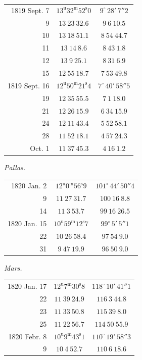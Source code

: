 \begin{center}
\begin{tabular}{r|c|c}
1819 Sept. 7 & $13^{\mathrm u}32^{\mathrm m}52^{\mathrm s}0$ & $9^\circ\,28'\,7''2$ \\
9 & $13\ 23\ 32.6$ & $9\ 6\ 10.5$ \\
10 & $13\ 18\ 51.1$ & $8\ 54\ 44.7$ \\
11 & $13\ 14\ 8.6$ & $8\ 43\ 1.8$ \\
12 & $13\ 9\ 25.1$ & $8\ 31\ 6.9$ \\
15 & $12\ 55\ 18.7$ & $7\ 53\ 49.8$ \\
\hline
1819 Sept. 16 & $12^{\mathrm u}50^{\mathrm m}21^{\mathrm s}4$ & $7^\circ\,40'\,58''5$ \\
19 & $12\ 35\ 55.5$ & $7\ 1\ 18.0$ \\
21 & $12\ 26\ 15.9$ & $6\ 34\ 15.9$ \\
24 & $12\ 11\ 43.4$ & $5\ 52\ 58.1$ \\
28 & $11\ 52\ 18.1$ & $4\ 57\ 24.3$ \\
Oct. 1 & $11\ 37\ 45.3$ & $4\ 16\ 1.2$ \\
\end{tabular}
\end{center}

\begin{center}
\textit{Pallas.}
\end{center}

\begin{center}
\begin{tabular}{r|c|c}
1820 Jan. 2 & $12^{\mathrm u}0^{\mathrm m}56^{\mathrm s}9$ & $101^\circ\,44'\,50''4$ \\
9 & $11\ 27\ 31.7$ & $100\ 16\ 8.8$ \\
14 & $11\ 3\ 53.7$ & $99\ 16\ 26.5$ \\
\hline
1820 Jan. 15 & $10^{\mathrm u}59^{\mathrm m}12^{\mathrm s}7$ & $99^\circ\,5'\,5''1$ \\
22 & $10\ 26\ 58.4$ & $97\ 54\ 9.0$ \\
31 & $9\ 47\ 19.9$ & $96\ 50\ 9.0$ \\
\end{tabular}
\end{center}

\begin{center}
\textit{Mars.}
\end{center}

\begin{center}
\begin{tabular}{r|c|c}
1820 Jan. 17 & $12^{\mathrm u}7^{\mathrm m}30^{\mathrm s}8$ & $118^\circ\,10'\,41''1$ \\
22 & $11\ 39\ 24.9$ & $116\ 3\ 44.8$ \\
23 & $11\ 33\ 50.8$ & $115\ 39\ 8.0$ \\
25 & $11\ 22\ 56.7$ & $114\ 50\ 55.9$ \\
\hline
1820 Febr. 8 & $10^{\mathrm u}9^{\mathrm m}43^{\mathrm s}1$ & $110^\circ\,19'\,58''3$ \\
9 & $10\ 4\ 52.7$ & $110\ 6\ 18.6$ \\
\end{tabular}
\end{center}

